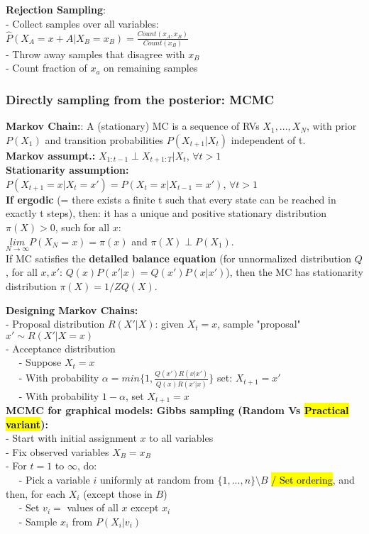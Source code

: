 \textbf{Rejection Sampling}:\\
- Collect samples over all variables:\\
    $\hat{P}(X_A =x+A | X_B=x_B)=\frac{Count(x_A, x_B)}{Count(x_B)}$\\
- Throw away samples that disagree with $x_B$\\
- Count fraction of $x_a$ on remaining samples


\subsubsection{Directly sampling from the posterior: MCMC}
\textbf{Markov Chain:}: A (stationary) MC is a sequence of RVs $X_1, ..., X_N$, with prior $P(X_1)$ and transition probabilities $P(X_{t+1}|X_t)$ independent of t.\\
\textbf{Markov assumpt.:} $X_{1:t-1}\perp X_{t+1:T}|X_t$, $\forall t>1$\\
\textbf{Stationarity assumption:}\\
$P(X_{t+1}=x|X_t=x')=P(X_{t}=x|X_{t-1}=x')$, $\forall t>1$\\
\textbf{If ergodic} (= there exists a finite t such that every state can be reached in exactly t steps), then: it has a unique and positive stationary distribution $\pi(X)>0$, such for all $x$:\\
            $\underset{N\rightarrow\infty}{lim}P(X_N=x)=\pi(x)$ and $\pi(X)\perp P(X_1)$.\\
If MC satisfies the \textbf{detailed balance equation} (for unnormalized distribution $Q$, for all $x,x'$: $Q(x)P(x'|x)=Q(x')P(x|x')$), then the MC has stationarity distribution $\pi(X)=1/ZQ(X)$.

\textbf{Designing Markov Chains:}\\
- Proposal distribution $R(X'|X)$: given $X_t=x$, sample "proposal" $x'\sim R(X'|X=x)$\\
- Acceptance distribution\\
$\quad$ - Suppose $X_t=x$\\
$\quad$ - With probability $\alpha=min \Big\{1, \frac{Q(x')R(x|x')}{Q(x)R(x'|x)}\Big\}$
        set: $X_{t+1}=x'$\\
$\quad$ - With probability $1-\alpha$, set $X_{t+1}=x$\\

\textbf{MCMC for graphical models: Gibbs sampling (Random Vs \hl{Practical variant}):}\\
- Start with initial assignment $x$ to all variables\\
- Fix observed variables $X_B=x_B$\\
- For $t=1$ to $\infty$, do:\\
$\quad$ - Pick a variable $i$ uniformly at random from $\{1,...,n\}\setminus B$ \hl{/ Set ordering}, and then, for each $X_i$ (except those in $B$)\\
$\quad$ - Set $v_i=$ values of all $x$ except $x_i$\\
$\quad$ - Sample $x_i$ from $P(X_i|v_i)$





